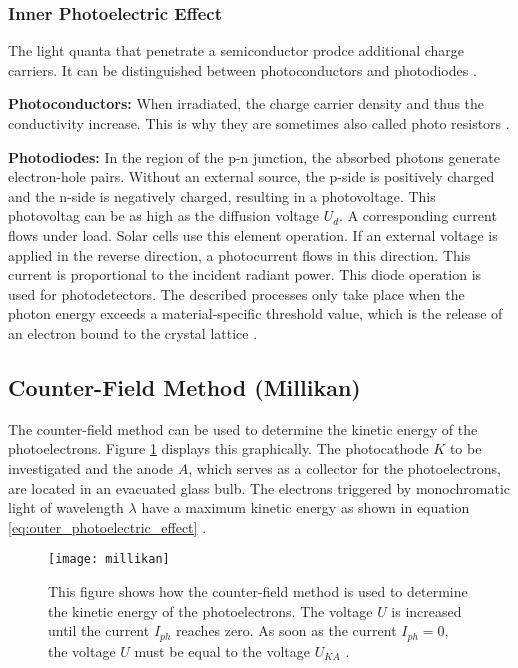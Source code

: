 \subsubsection{Inner Photoelectric Effect}
\label{subsubsec:Inner_Photoelectric_Effect}
The light quanta that penetrate a semiconductor prodce additional charge carriers. It can be distinguished between photoconductors and photodiodes \cite{light_quantum}.

\textbf{Photoconductors:} When irradiated, the charge carrier density and thus the conductivity increase. This is why they are sometimes also called photo resistors \cite{light_quantum}.

\textbf{Photodiodes:} In the region of the p-n junction, the absorbed photons generate electron-hole pairs. Without an external source, the p-side is positively charged and the n-side is negatively charged, resulting in a photovoltage. This photovoltag can be as high as the diffusion voltage $U_d$. A corresponding current flows under load. Solar cells use this element operation. If an external voltage is applied in the reverse direction, a photocurrent flows in this direction. This current is proportional to the incident radiant power. This diode operation is used for photodetectors. The described processes only take place when the photon energy exceeds a material-specific threshold value, which is the release of an electron bound to the crystal lattice \cite{light_quantum}.

\newpage
\subsection{Counter-Field Method (Millikan)}
\label{subsec:Countervailing_Field_Method}
The counter-field method can be used to determine the kinetic energy of the photoelectrons. Figure \ref{fig:millikan} displays this graphically. The photocathode $K$ to be investigated and the anode $A$, which serves as a collector for the photoelectrons, are located in an evacuated glass bulb. The electrons triggered by monochromatic light of wavelength $\lambda$ have a maximum kinetic energy as shown in equation \ref{eq:outer_photoelectric_effect} \cite{light_quantum}.

\begin{figure}[H]
	\centering
	\texttt{[image: millikan]}
	\caption{This figure shows how the counter-field method is used to determine the kinetic energy of the photoelectrons. The voltage $U$ is increased until the current $I_{ph}$ reaches zero. As soon as the current $I_{ph} = 0$, the voltage $U$ must be equal to the voltage $U_{KA}$ \cite{light_quantum}.}
	\label{fig:millikan}
\end{figure}


